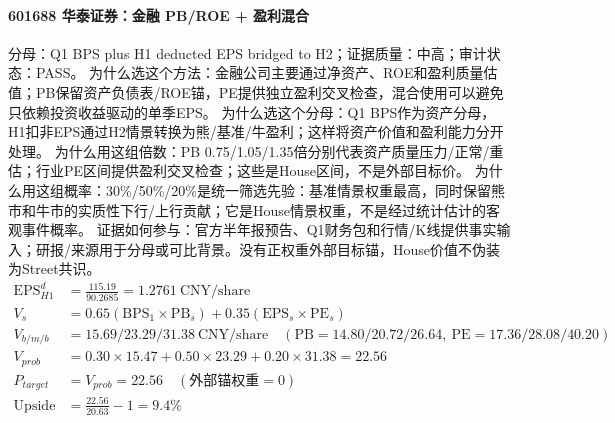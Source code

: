 \paragraph{601688 华泰证券：金融 PB/ROE + 盈利混合}
分母：Q1 BPS plus H1 deducted EPS bridged to H2；证据质量：中高；审计状态：PASS。
为什么选这个方法：金融公司主要通过净资产、ROE和盈利质量估值；PB保留资产负债表/ROE锚，PE提供独立盈利交叉检查，混合使用可以避免只依赖投资收益驱动的单季EPS。
为什么选这个分母：Q1 BPS作为资产分母，H1扣非EPS通过H2情景转换为熊/基准/牛盈利；这样将资产价值和盈利能力分开处理。
为什么用这组倍数：PB 0.75/1.05/1.35倍分别代表资产质量压力/正常/重估；行业PE区间提供盈利交叉检查；这些是House区间，不是外部目标价。
为什么用这组概率：30\%/50\%/20\%是统一筛选先验：基准情景权重最高，同时保留熊市和牛市的实质性下行/上行贡献；它是House情景权重，不是经过统计估计的客观事件概率。
证据如何参与：官方半年报预告、Q1财务包和行情/K线提供事实输入；研报/来源用于分母或可比背景。没有正权重外部目标锚，House价值不伪装为Street共识。
\begin{align*}
\mathrm{EPS}_{H1}^d &= \frac{115.19}{90.2685} = 1.2761\ \mathrm{CNY/share}\\
V_s &= 0.65\left(\mathrm{BPS}_1\times \mathrm{PB}_s\right)+0.35\left(\mathrm{EPS}_s\times \mathrm{PE}_s\right)\\
V_{b/m/b} &= 15.69/23.29/31.38\ \mathrm{CNY/share}\quad(\mathrm{PB}=14.80/20.72/26.64,\ \mathrm{PE}=17.36/28.08/40.20)\\
V_{prob} &= 0.30\times 15.47+0.50\times 23.29+0.20\times 31.38=22.56\\
P_{target} &= V_{prob}=22.56\quad(\text{外部锚权重}=0)\\
\mathrm{Upside} &= \frac{22.56}{20.63}-1=9.4\%\\
\end{align*}

